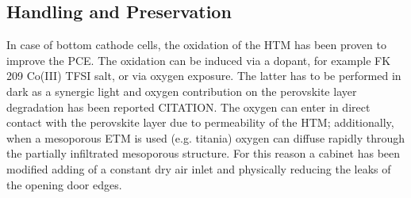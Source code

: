 	\subsection{Handling and Preservation}
		In case of bottom cathode cells, the oxidation of the HTM has been proven to improve the PCE. The oxidation can be induced via a dopant, for example FK 209 Co(III) TFSI salt\cite{Burschka2013}, or via oxygen exposure. The latter has to be performed in dark as a synergic light and oxygen contribution on the perovskite layer degradation has been reported CITATION. The oxygen can enter in direct contact with the perovskite layer due to permeability of the HTM; additionally, when a mesoporous ETM is used (e.g. titania) oxygen can diffuse rapidly through the partially infiltrated mesoporous structure. For this reason a cabinet has been modified adding of a constant dry air inlet and physically reducing the leaks of the opening door edges.

		\begin{figure}%
			\label{fig:microscope_degradation}
		\end{figure}

